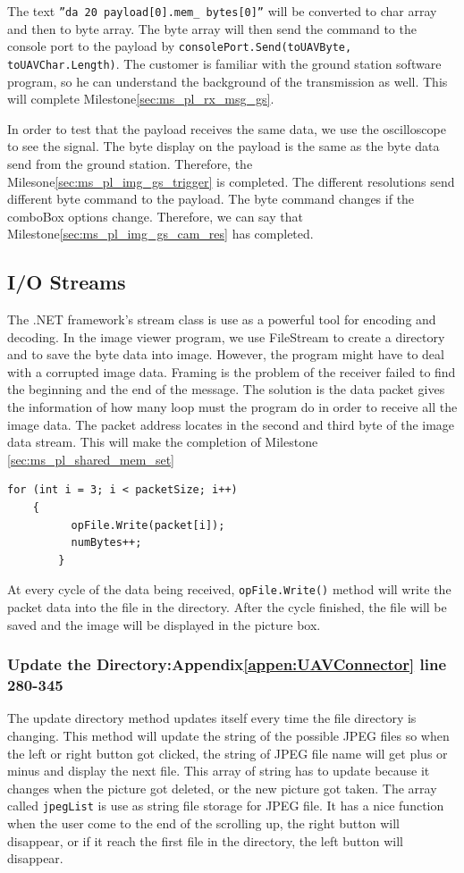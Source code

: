 The text \texttt{''da 20 payload[0].mem\_ bytes[0]''} will be converted to char array and then to byte array. The byte array will then send the command to the console port to the payload by \texttt{consolePort.Send(toUAVByte, toUAVChar.Length)}. The customer is familiar with the ground station software program, so he can understand the background of the transmission as well. This will complete Milestone\ref{sec:ms_pl_rx_msg_gs}.

In order to test that the payload receives the same data, we use the oscilloscope to see the signal. The byte display on the payload is the same as the byte data send from the ground station. Therefore, the Milesone\ref{sec:ms_pl_img_gs_trigger} is completed. The different resolutions send different byte command to the payload. The byte command changes if the comboBox options change. Therefore, we can say that Milestone\ref{sec:ms_pl_img_gs_cam_res} has completed.

\subsection{I/O Streams}
    The .NET framework's stream class is use as a powerful tool for encoding and decoding\cite{davidB}. In the image viewer program, we use FileStream to create a directory and to save the byte data into image. However, the program might have to deal with a corrupted image data. Framing is the problem of the receiver failed to find the beginning and the end of the message. The solution is the data packet gives the information of how many loop must the program do in order to receive all the image data. The packet address locates in the second and third byte of the image data stream. This will make the completion of Milestone \ref{sec:ms_pl_shared_mem_set}
    
\begin{lstlisting}[caption={writing binary file},label=lst:writingb]          
	for (int i = 3; i < packetSize; i++)
	{
          opFile.Write(packet[i]);
          numBytes++;
    	}
\end{lstlisting}         

At every cycle of the data being received, \texttt{opFile.Write()} method will write the packet data into the file in the directory. After the cycle finished, the file will be saved and the image will be displayed in the picture box. 

\subsubsection*{Update the Directory:Appendix\ref{appen:UAVConnector} line 280-345}
The update directory method updates itself every time the file directory is changing. This method will update the string of the possible JPEG files so when the left or right button got clicked, the string of JPEG file name will get plus or minus and display the next file. This array of string has to update because it changes when the picture got deleted, or the new picture got taken. The array called \texttt{jpegList} is use as string file storage for JPEG file. It has a nice function when the user come to the end of the scrolling up, the right button will disappear, or if it reach the first file in the directory, the left button will disappear. 
